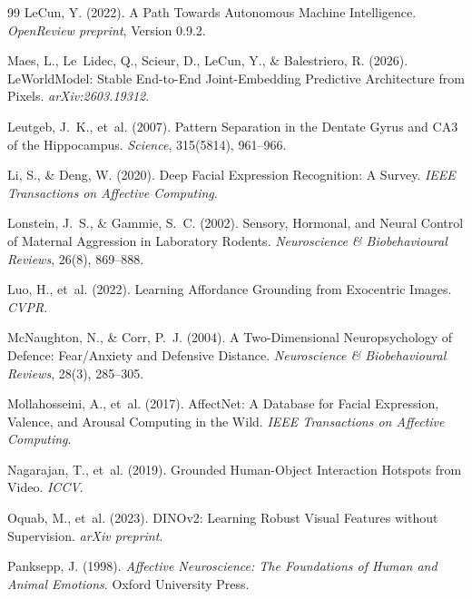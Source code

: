 \documentclass[11pt]{article}
\begin{document}
\begin{thebibliography}{99}
LeCun, Y. (2022).
\newblock A Path Towards Autonomous Machine Intelligence.
\newblock \emph{OpenReview preprint}, Version 0.9.2.

Maes, L., Le~Lidec, Q., Scieur, D., LeCun, Y., \& Balestriero, R. (2026).
\newblock LeWorldModel: Stable End-to-End Joint-Embedding Predictive Architecture from Pixels.
\newblock \emph{arXiv:2603.19312}.

Leutgeb, J.~K., et~al. (2007).
\newblock Pattern Separation in the Dentate Gyrus and CA3 of the Hippocampus.
\newblock \emph{Science}, 315(5814), 961--966.

Li, S., \& Deng, W. (2020).
\newblock Deep Facial Expression Recognition: A Survey.
\newblock \emph{IEEE Transactions on Affective Computing}.

Lonstein, J.~S., \& Gammie, S.~C. (2002).
\newblock Sensory, Hormonal, and Neural Control of Maternal Aggression in Laboratory Rodents.
\newblock \emph{Neuroscience \& Biobehavioural Reviews}, 26(8), 869--888.

Luo, H., et~al. (2022).
\newblock Learning Affordance Grounding from Exocentric Images.
\newblock \emph{CVPR}.

McNaughton, N., \& Corr, P.~J. (2004).
\newblock A Two-Dimensional Neuropsychology of Defence: Fear/Anxiety and Defensive Distance.
\newblock \emph{Neuroscience \& Biobehavioural Reviews}, 28(3), 285--305.

Mollahosseini, A., et~al. (2017).
\newblock AffectNet: A Database for Facial Expression, Valence, and Arousal Computing in the Wild.
\newblock \emph{IEEE Transactions on Affective Computing}.

Nagarajan, T., et~al. (2019).
\newblock Grounded Human-Object Interaction Hotspots from Video.
\newblock \emph{ICCV}.

Oquab, M., et~al. (2023).
\newblock DINOv2: Learning Robust Visual Features without Supervision.
\newblock \emph{arXiv preprint}.

Panksepp, J. (1998).
\newblock \emph{Affective Neuroscience: The Foundations of Human and Animal Emotions}.
\newblock Oxford University Press.


\end{thebibliography}
\end{document}

